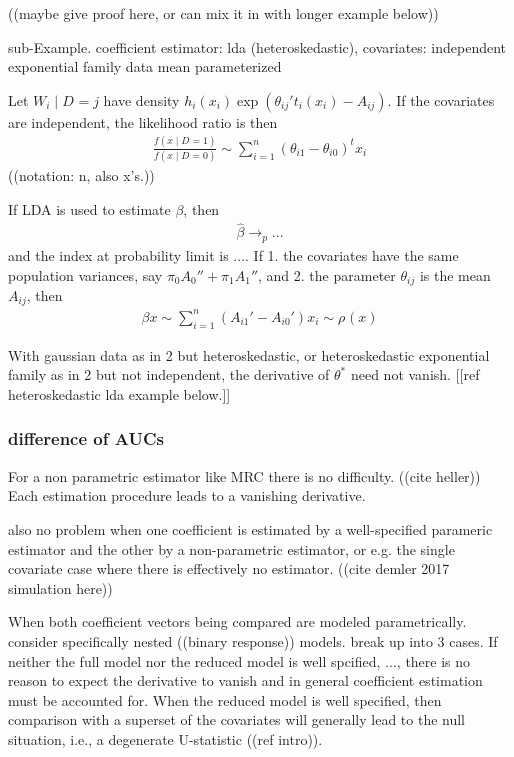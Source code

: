 \documentclass[12pt]{article}
\newcommand{\W}[1][]{W_{#1}}
\newcommand{\D}[1][]{D_{#1}}
\renewcommand{\star}[1]{{#1}^\ast}
\newcommand{\risk}[1][]{\rho_{#1}}
\newcommand{\auc}{\theta}
\theoremstyle{definition}
\begin{document}
((maybe give proof here, or can mix it in with longer example below))


sub-Example. coefficient estimator: lda (heteroskedastic), covariates:
independent exponential family data mean parameterized

Let $\W[i]\mid \D=j$ have density
$h_i(x_i)\exp(\theta_{ij}'t_i(x_i)-A_{ij})$. If the covariates are
independent, the likelihood ratio is then
\begin{align}
 \frac{f(x\mid \D=1)}{f(x\mid \D=0)} \sim \sum_{i=1}^n(\theta_{i1}-\theta_{i0})^tx_i
\end{align}
((notation: n, also x's.))

If LDA is used to estimate $\beta$, then
\begin{align}
  \hat\beta \to_p ...
\end{align}
and the index at probability limit is $...$. If 1. the covariates have the same population variances, say $\pi_0A_0''+\pi_1A_1''$, and 2. the parameter $\theta_{ij}$ is the mean $A_{ij}$, then
\begin{align}
  \beta x \sim \sum_{i=1}^n(A_{i1}'-A_{i0}')x_i \sim \risk (x)
\end{align}


With gaussian data as in 2 but heteroskedastic, or heteroskedastic exponential family as in
2 but not independent, the derivative of $\star\auc$ need not vanish. [[ref
heteroskedastic lda example below.]]

\subsubsection{difference of AUCs}

For a non parametric estimator like MRC there is no difficulty. ((cite
heller)) Each estimation procedure leads to a vanishing derivative.

also no problem when one coefficient is estimated by a well-specified
parameric estimator and the other by a non-parametric estimator, or e.g.
the single covariate case where there is effectively no estimator. %
((cite demler 2017 simulation here))




When both coefficient vectors being compared are modeled
parametrically. consider specifically nested ((binary response)) models.
break up into 3 cases. If neither the full model nor the reduced model
is well spcified, $...$, there is no reason to expect the derivative
to vanish and in general coefficient estimation must be accounted
for. When the reduced model is well specified, then comparison with a
superset of the covariates will generally lead to the null situation,
i.e., a degenerate U-statistic ((ref intro)).
\end{document}
